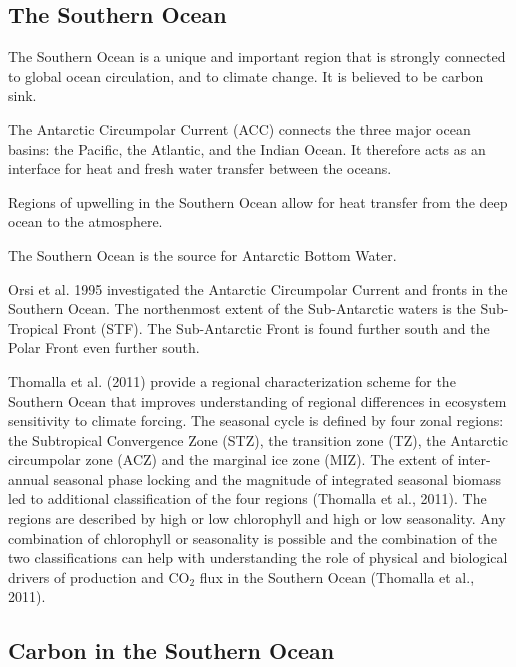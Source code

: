 \documentclass[11pt, a4paper]{article}
\numberwithin{figure}{section}
\numberwithin{table}{section}
\begin{document}

\subsection{The Southern Ocean}
The Southern Ocean is a unique and important region that is strongly connected
to global ocean circulation, and to climate change. It is believed to be carbon
sink.

The Antarctic Circumpolar Current (ACC) connects the three major ocean basins: 
the Pacific, the Atlantic, and the Indian Ocean. It therefore acts as an interface
for heat and fresh water transfer between the oceans.

Regions of upwelling in the Southern Ocean allow for heat transfer from
the deep ocean to the atmosphere.

The Southern Ocean is the source for Antarctic Bottom Water. 

Orsi et al. 1995 investigated the Antarctic Circumpolar Current and 
fronts in the Southern Ocean.
The northenmost extent of the Sub-Antarctic waters is the Sub-Tropical 
Front (STF). 
The Sub-Antarctic Front is found further south and the Polar Front even
further south.


Thomalla et al. (2011) provide a regional characterization scheme for the 
Southern Ocean that improves understanding of regional differences in ecosystem 
sensitivity to climate forcing. The seasonal cycle is defined by four zonal 
regions: the Subtropical Convergence Zone (STZ), the transition zone (TZ), the 
Antarctic circumpolar zone (ACZ) and the marginal ice zone (MIZ). 
The extent of inter-annual seasonal phase locking and the magnitude of 
integrated seasonal biomass led to additional classification of the four regions 
(Thomalla et al., 2011). 
The regions are described by high or low chlorophyll 
and high or low seasonality. Any combination of chlorophyll or seasonality 
is possible and the combination of 
the two classifications can help with understanding the role of physical and 
biological drivers of production and CO$_2$ flux in the Southern Ocean 
(Thomalla et al., 2011).

\subsection{Carbon in the Southern Ocean}
\end{document}
